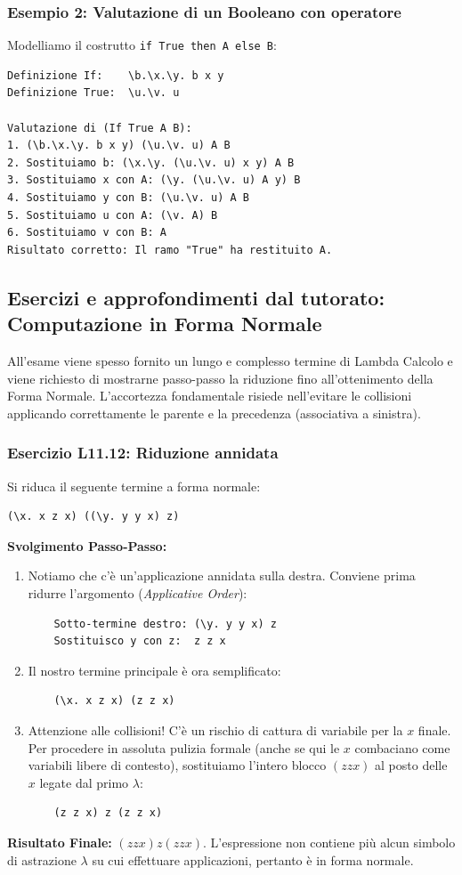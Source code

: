 \documentclass[12pt, a4paper]{article}
\begin{document}
\subsubsection{Esempio 2: Valutazione di un Booleano con operatore}
Modelliamo il costrutto \texttt{if True then A else B}:
\begin{verbatim}
Definizione If:    \b.\x.\y. b x y
Definizione True:  \u.\v. u

Valutazione di (If True A B):
1. (\b.\x.\y. b x y) (\u.\v. u) A B
2. Sostituiamo b: (\x.\y. (\u.\v. u) x y) A B
3. Sostituiamo x con A: (\y. (\u.\v. u) A y) B
4. Sostituiamo y con B: (\u.\v. u) A B
5. Sostituiamo u con A: (\v. A) B
6. Sostituiamo v con B: A 
Risultato corretto: Il ramo "True" ha restituito A.
\end{verbatim}

\subsection{Esercizi e approfondimenti dal tutorato: Computazione in Forma Normale}
All'esame viene spesso fornito un lungo e complesso termine di Lambda Calcolo e viene richiesto di mostrarne passo-passo la riduzione fino all'ottenimento della Forma Normale. L'accortezza fondamentale risiede nell'evitare le collisioni applicando correttamente le parente e la precedenza (associativa a sinistra).

\subsubsection{Esercizio L11.12: Riduzione annidata}
Si riduca il seguente termine a forma normale:
\begin{verbatim}
(\x. x z x) ((\y. y y x) z)
\end{verbatim}

\textbf{Svolgimento Passo-Passo:}
\begin{enumerate}
    \item Notiamo che c'è un'applicazione annidata sulla destra. Conviene prima ridurre l'argomento (\textit{Applicative Order}):
    \begin{verbatim}
    Sotto-termine destro: (\y. y y x) z
    Sostituisco y con z:  z z x
    \end{verbatim}
    \item Il nostro termine principale è ora semplificato:
    \begin{verbatim}
    (\x. x z x) (z z x)
    \end{verbatim}
    \item Attenzione alle collisioni! C'è un rischio di cattura di variabile per la $x$ finale. Per procedere in assoluta pulizia formale (anche se qui le $x$ combaciano come variabili libere di contesto), sostituiamo l'intero blocco $(z z x)$ al posto delle $x$ legate dal primo $\lambda$:
    \begin{verbatim}
    (z z x) z (z z x)
    \end{verbatim}
\end{enumerate}
\textbf{Risultato Finale:} $(z z x) z (z z x)$. L'espressione non contiene più alcun simbolo di astrazione $\lambda$ su cui effettuare applicazioni, pertanto è in forma normale.
\end{document}
